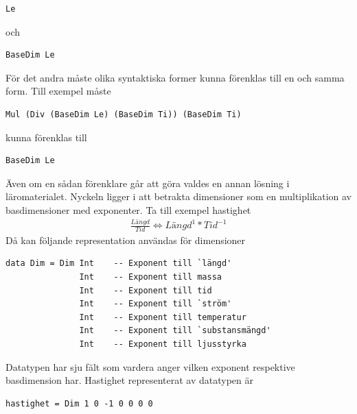 \begin{lstlisting}[frame=none, belowskip=-0.5\baselineskip, xleftmargin=0.5in]
Le
\end{lstlisting}

och

\begin{lstlisting}[frame=none, belowskip=-0.5\baselineskip, xleftmargin=0.5in]
BaseDim Le
\end{lstlisting}

För det andra måste olika syntaktiska former kunna förenklas till en och samma
form. Till exempel måste

\begin{lstlisting}[frame=none, belowskip=-0.5\baselineskip, xleftmargin=0.5in]
Mul (Div (BaseDim Le) (BaseDim Ti)) (BaseDim Ti)
\end{lstlisting}

kunna förenklas till

\begin{lstlisting}[frame=none, belowskip=-0.5\baselineskip, xleftmargin=0.5in]
BaseDim Le
\end{lstlisting}

Även om en sådan förenklare går att göra valdes en annan lösning i
läromaterialet. Nyckeln ligger i att betrakta dimensioner som en multiplikation
av basdimensioner med exponenter. Ta till exempel hastighet
\begin{align*}
  \frac{\textit{Längd}}{\textit{Tid}} \iff \textit{Längd}^1 * Tid^{-1}
\end{align*}
Då kan följande representation användas för dimensioner

\begin{lstlisting}[frame=none, belowskip=-0.5\baselineskip, xleftmargin=0.5in]
data Dim = Dim Int    -- Exponent till `längd'
               Int    -- Exponent till massa
               Int    -- Exponent till tid
               Int    -- Exponent till `ström'
               Int    -- Exponent till temperatur
               Int    -- Exponent till `substansmängd'
               Int    -- Exponent till ljusstyrka
\end{lstlisting}

Datatypen har sju fält som vardera anger vilken exponent respektive
basdimension har. Hastighet representerat av datatypen är

\begin{lstlisting}[frame=none, belowskip=-0.5\baselineskip, xleftmargin=0.5in]
hastighet = Dim 1 0 -1 0 0 0 0
\end{lstlisting}

